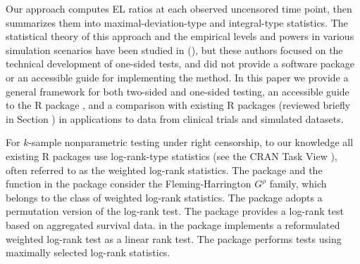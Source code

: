 Our approach computes %
EL ratios at each observed uncensored time point, then summarizes them into maximal-deviation-type and integral-type statistics. The statistical theory of this approach and the empirical levels and powers in various simulation scenarios have been studied in \citeauthor{CM:2016} (\citeyear{CM:2016, CM:2019}), but these authors focused on the technical development of one-sided tests, and did not provide a software package or an accessible guide for implementing the method. 
In this paper we provide a general framework for both two-sided and one-sided testing, an accessible guide to the R package , and a comparison with existing R packages (reviewed briefly in Section ) in applications to data from clinical trials and simulated datasets.



For $k$-sample nonparametric testing under right censorship, to our knowledge all existing R packages use %
log-rank-type statistics (see the CRAN Task View ),
 often referred to as the weighted log-rank statistics. %
The package  \cite[][]{FHtest:2017} and the  function in the package   consider the Fleming-Harrington $G^{\rho}$ family, which belongs to the %
class  of weighted log-rank statistics. %
The package  \cite[][]{clinfun:2018} %
adopts a permutation version of the log-rank test. %
The package  \cite[][]{LogrankA:2013} provides a log-rank test based on aggregated survival data.
 in the  \cite[][]{coin:2017} package implements a reformulated
weighted log-rank test as a linear rank test.
The  \cite[][]{maxstat:2017} package performs tests using maximally selected log-rank statistics. 

